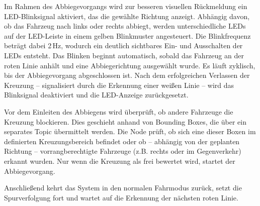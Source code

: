 Im Rahmen des Abbiegevorgangs wird zur besseren visuellen Rückmeldung ein LED-Blinksignal aktiviert, das die 
gewählte Richtung anzeigt. Abhängig davon, ob das Fahrzeug nach links oder rechts abbiegt, werden unterschiedliche 
LEDs auf der LED-Leiste in einem gelben Blinkmuster angesteuert. Die Blinkfrequenz beträgt dabei 2\,Hz, wodurch ein 
deutlich sichtbares Ein- und Ausschalten der LEDs entsteht. Das Blinken beginnt automatisch, sobald das Fahrzeug 
an der roten Linie anhält und eine Abbiegerichtung ausgewählt wurde. Es läuft zyklisch, bis der Abbiegevorgang 
abgeschlossen ist. Nach dem erfolgreichen Verlassen der Kreuzung – signalisiert durch die Erkennung einer weißen 
Linie – wird das Blinksignal deaktiviert und die LED-Anzeige zurückgesetzt.

Vor dem Einleiten des Abbiegens wird überprüft, ob andere Fahrzeuge die Kreuzung blockieren. Dies geschieht 
anhand von Bounding Boxes, die über ein separates Topic übermittelt werden. Die Node prüft, ob sich eine dieser 
Boxen im definierten Kreuzungsbereich befindet oder ob – abhängig von der geplanten Richtung – vorrangberechtigte 
Fahrzeuge (z.B. rechts oder im Gegenverkehr) erkannt wurden. Nur wenn die Kreuzung als frei bewertet wird, startet 
der Abbiegevorgang.

Anschließend kehrt das System in den normalen Fahrmodus zurück, setzt die Spurverfolgung fort und wartet auf 
die Erkennung der nächsten roten Linie.



